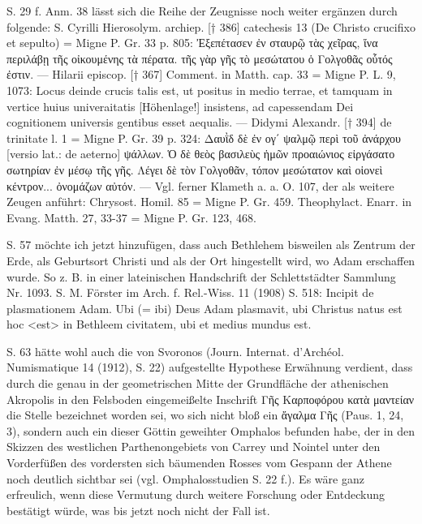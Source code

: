 \documentclass[a4paper, 11pt, oneside]{article}
\begin{document}
S. 29 f. Anm. 38 lässt sich die Reihe der Zeugnisse noch weiter ergänzen durch folgende: S. Cyrilli Hierosolym. archiep. [† 386] catechesis 13 (De Christo crucifixo et sepulto) = Migne P. Gr. 33 p. 805: Ἐξεπέτασεν ἐν σταυρῷ τὰς χεῖρας, ἵνα περιλάβῃ τῆς οἰκουμένης τὰ πέρατα. τῆς γὰρ γῆς τὸ μεσώτατου ὁ Γολγοθᾶς οὗτός ἐστιν. --- Hilarii episcop. [† 367] Comment. in Matth. cap. 33 = Migne P. L. 9, 1073: Locus deinde crucis talis est, ut positus in medio terrae, et tamquam in vertice huius univeraitatis [Höhenlage!] insistens, ad capessendam Dei cognitionem universis gentibus esset aequalis. --- Didymi Alexandr. [† 394] de trinitate l. 1 = Migne P. Gr. 39 p. 324: Δαυῒδ δὲ ἐν ογ΄ ψαλμῷ περὶ τοῦ ἀνάρχου [versio lat.: de aeterno] ψάλλων. Ὁ δὲ θεὸς βασιλεὺς ἡμῶν προαιώνιος εἰργάσατο σωτηρίαν ἐν μέσῳ τῆς γῆς. Λέγει δὲ τὸν Γολγοθᾶν, τόπον μεσώτατον καὶ οἱονεὶ κέντρον... ὀνομάζων αὐτόν. --- Vgl. ferner Klameth a. a. O. 107, der als weitere Zeugen anführt: Chrysost. Homil. 85 = Migne P. Gr. 459. Theophylact. Enarr. in Evang. Matth. 27, 33-37 = Migne P. Gr. 123, 468.

S. 57 möchte ich jetzt hinzufügen, dass auch Bethlehem bisweilen als Zentrum der Erde, als Geburtsort Christi und als der Ort hingestellt wird, wo Adam erschaffen wurde. So z. B. in einer lateinischen Handschrift der Schlettstädter Sammlung Nr. 1093. S. M. Förster im Arch. f. Rel.-Wiss. 11 (1908) S. 518: Incipit de plasmationem Adam. Ubi (= ibi) Deus Adam plasmavit, ubi Christus natus est hoc <est> in Bethleem civitatem, ubi et medius mundus est.

S. 63 hätte wohl auch die von Svoronos (Journ. Internat. d'Archéol. Numismatique 14 (1912), S. 22) aufgestellte Hypothese Erwähnung verdient, dass durch die genau in der geometrischen Mitte der Grundfläche der athenischen Akropolis in den Felsboden eingemeißelte Inschrift Γῆς Καρποφόρου κατὰ μαντείαν die Stelle bezeichnet worden sei, wo sich nicht bloß ein ἄγαλμα Γῆς (Paus. 1, 24, 3), sondern auch ein dieser Göttin geweihter Omphalos befunden habe, der in den Skizzen des westlichen Parthenongebiets von Carrey und Nointel unter den Vorderfüßen des vordersten sich bäumenden Rosses vom Gespann der Athene noch deutlich sichtbar sei (vgl. Omphalosstudien S. 22 f.). Es wäre ganz erfreulich, wenn diese Vermutung durch weitere Forschung oder Entdeckung bestätigt würde, was bis jetzt noch nicht der Fall ist.
\end{document}
